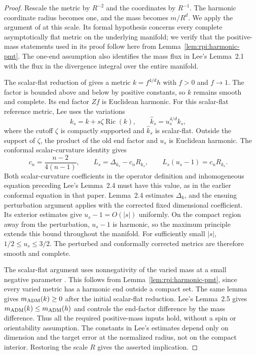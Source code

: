 \begin{proof}
Rescale the metric by $R^{-2}$ and the coordinates by $R^{-1}$.
The harmonic coordinate radius becomes one, and the mass becomes
$m/R^d$. We apply the argument of
\cite[Theorem~1.3]{Lee2007NearEquality} at this scale. Its formal
hypothesis concerns every complete asymptotically flat metric on the
underlying manifold; we verify that the positive-mass statements used
in its proof follow here from Lemma~\ref{lem:rpi:harmonic-pmt}.
The one-end assumption also identifies the mass flux in Lee's
Lemma~2.1 with the flux in the divergence integral over the entire
manifold.

The scalar-flat reduction of
\cite[Lemma~2.5]{Lee2007NearEquality} gives a metric
$k=f^{4/d}h$ with $f>0$ and $f\to1$. The factor is bounded above
and below by positive constants, so $k$ remains smooth and complete.
Its end factor $Zf$ is Euclidean harmonic. For this scalar-flat
reference metric, Lee uses the variations
\[
 k_s=k+s\zeta\operatorname{Ric}(k),\qquad
 \widehat k_s=u_s^{4/d}k_s,
\]
where the cutoff $\zeta$ is compactly supported and
$\widehat k_s$ is scalar-flat. Outside the support of $\zeta$, the
product of the old end factor and $u_s$ is Euclidean harmonic.
The conformal scalar-curvature identity gives
\[
 c_n=\frac{n-2}{4(n-1)},\qquad
 L_s=\Delta_{k_s}-c_nR_{k_s},\qquad
 L_s(u_s-1)=c_nR_{k_s}.
\]
Both scalar-curvature coefficients in the operator definition and
inhomogeneous equation preceding Lee's Lemma~2.4 must have this value,
as in the earlier conformal equation in that paper. Lemma~2.4 estimates
$\Delta_k$, and the ensuing perturbation argument applies with the
corrected fixed dimensional coefficient. Its exterior estimates give
$u_s-1=O(|s|)$ uniformly. On the compact region away from the
perturbation, $u_s-1$ is harmonic, so the maximum principle extends
this bound throughout the manifold. For sufficiently small $|s|$,
$1/2\le u_s\le3/2$. The perturbed and conformally corrected metrics
are therefore smooth and complete.

The scalar-flat argument uses nonnegativity of the varied mass at a
small negative parameter
\cite[proof following Lemma~2.2]{Lee2007NearEquality}. This follows
from Lemma~\ref{lem:rpi:harmonic-pmt}, since every varied metric has
a harmonic end outside a compact set. The same lemma gives
$m_{\rm ADM}(k)\ge0$ after the initial scalar-flat reduction.
Lee's Lemma~2.5 gives $m_{\rm ADM}(k)\le m_{\rm ADM}(h)$ and
controls the end-factor difference by the mass difference.
Thus all the required
positive-mass inputs hold, without a spin or orientability assumption.
The constants in Lee's estimates depend only on dimension and the
target error at the normalized radius, not on the compact interior.
Restoring the scale $R$ gives the asserted implication.
\end{proof}

